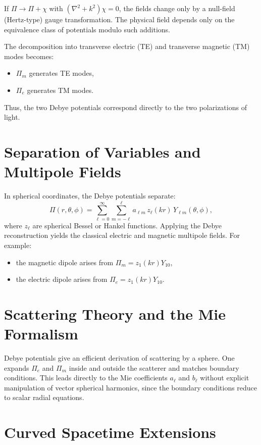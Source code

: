 \documentclass[11pt]{article}
\begin{document}
If $\Pi \to \Pi + \chi$ with $(\nabla^2 + k^2)\chi = 0$, the fields
change only by a null-field (Hertz-type) gauge transformation. The
physical field depends only on the equivalence class of potentials
modulo such additions.

The decomposition into transverse electric (TE) and transverse magnetic
(TM) modes becomes:
\begin{itemize}
\item $\Pi_m$ generates TE modes,
\item $\Pi_e$ generates TM modes.
\end{itemize}
Thus, the two Debye potentials correspond directly to the two
polarizations of light.

\section{Separation of Variables and Multipole Fields}

In spherical coordinates, the Debye potentials separate:
\begin{equation}
\Pi(r,\theta,\phi)
  = \sum_{\ell=0}^\infty \sum_{m=-\ell}^{\ell}
    a_{\ell m}\, z_\ell(kr)\, Y_{\ell m}(\theta,\phi),
\end{equation}
where $z_\ell$ are spherical Bessel or Hankel functions. Applying the
Debye reconstruction yields the classical electric and magnetic multipole
fields. For example:
\begin{itemize}
\item the magnetic dipole arises from $\Pi_m = z_1(kr) Y_{10}$,
\item the electric dipole arises from $\Pi_e = z_1(kr) Y_{10}$.
\end{itemize}

\section{Scattering Theory and the Mie Formalism}

Debye potentials give an efficient derivation of scattering by a sphere.
One expands $\Pi_e$ and $\Pi_m$ inside and outside the scatterer and
matches boundary conditions. This leads directly to the Mie
coefficients $a_\ell$ and $b_\ell$ without explicit manipulation of
vector spherical harmonics, since the boundary conditions reduce to
scalar radial equations.

\section{Curved Spacetime Extensions}
\end{document}
